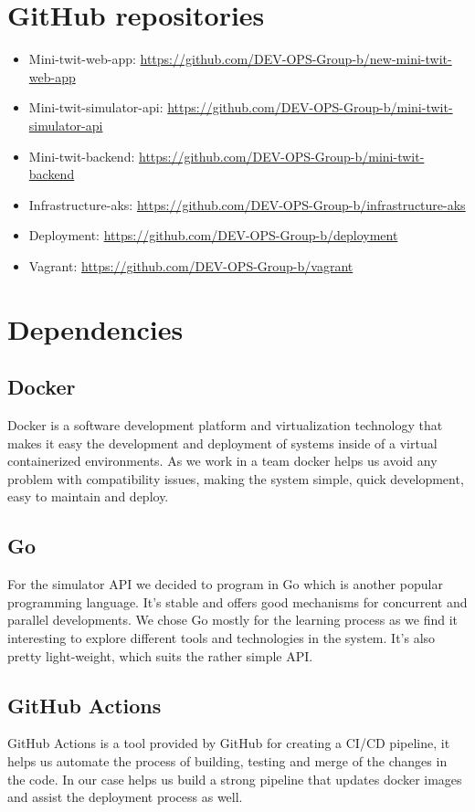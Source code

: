 \section{GitHub repositories}
\begin{itemize}
    \item Mini-twit-web-app: \url{https://github.com/DEV-OPS-Group-b/new-mini-twit-web-app}
    \item Mini-twit-simulator-api: \url{https://github.com/DEV-OPS-Group-b/mini-twit-simulator-api}
    \item Mini-twit-backend: \url{https://github.com/DEV-OPS-Group-b/mini-twit-backend}
    \item Infrastructure-aks: \url{https://github.com/DEV-OPS-Group-b/infrastructure-aks}
    \item Deployment: \url{https://github.com/DEV-OPS-Group-b/deployment}
    \item Vagrant: \url{https://github.com/DEV-OPS-Group-b/vagrant}
\end{itemize}

\section{Dependencies}\label{sec:dependencies}
\subsection{Docker}
Docker is a software development platform and virtualization technology that makes it easy the development and deployment of systems inside of  a virtual containerized environments. As we work in a team docker helps us avoid any problem with compatibility issues, making the system simple, quick development, easy to maintain and deploy.

\subsection{Go}
For the simulator API we decided to program in Go which is another popular programming language. It's stable and offers good mechanisms for concurrent and parallel developments. We chose Go mostly for the learning process as we find it interesting to explore different tools and technologies in the system. It's also pretty light-weight, which suits the rather simple API.

\subsection{GitHub Actions}
GitHub Actions is a tool provided by GitHub for creating a CI/CD pipeline, it helps us automate the process of building, testing and merge of the changes in the code. In our case helps us build a strong pipeline that updates docker images and assist the deployment process as well.

